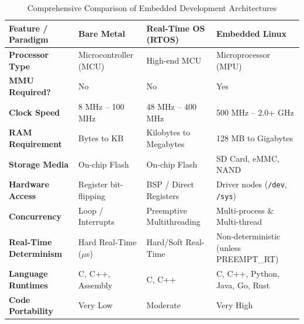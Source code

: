 \begin{table}[h!]
\centering
\caption{Comprehensive Comparison of Embedded Development Architectures}
\label{tab:arch_comparison}
\small
\begin{tabularx}{\textwidth}{l X X X}
\toprule
\textbf{Feature / Paradigm} & \textbf{Bare Metal} & \textbf{Real-Time OS (RTOS)} & \textbf{Embedded Linux} \\
\midrule
\textbf{Processor Type} & Microcontroller (MCU) & High-end MCU & Microprocessor (MPU) \\
\textbf{MMU Required?} & No & No & Yes \\
\textbf{Clock Speed} & 8 MHz -- 100 MHz & 48 MHz -- 400 MHz & 500 MHz -- 2.0+ GHz \\
\textbf{RAM Requirement} & Bytes to KB & Kilobytes to Megabytes & 128 MB to Gigabytes \\
\textbf{Storage Media} & On-chip Flash & On-chip Flash & SD Card, eMMC, NAND \\
\textbf{Hardware Access} & Register bit-flipping & BSP / Direct Registers & Driver nodes (\texttt{/dev}, \texttt{/sys}) \\
\textbf{Concurrency} & Loop / Interrupts & Preemptive Multithreading & Multi-process \& Multi-thread \\
\textbf{Real-Time Determinism} & Hard Real-Time ($\mu$s) & Hard/Soft Real-Time & Non-deterministic (unless PREEMPT\_RT) \\
\textbf{Language Runtimes} & C, C++, Assembly & C, C++ & C, C++, Python, Java, Go, Rust \\
\textbf{Code Portability} & Very Low & Moderate & Very High \\
\bottomrule
\end{tabularx}
\end{table}
